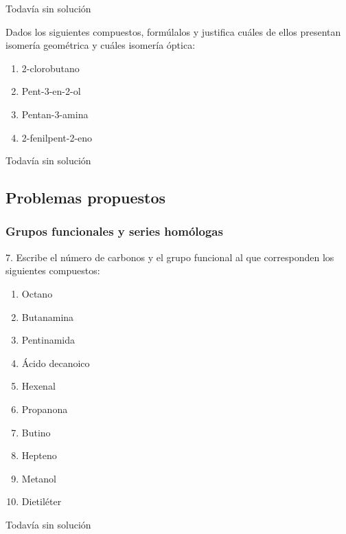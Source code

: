 \documentclass{article}
\begin{document}
\begin{solution}[print=false]
  Todavía sin solución
\end{solution}

\begin{exercise}
  Dados los siguientes compuestos, formúlalos y justifica cuáles
  de ellos presentan isomería geométrica y cuáles isomería
  óptica:
  \begin{enumerate}
    \item 2-clorobutano
    \item Pent-3-en-2-ol
    \item Pentan-3-amina
    \item 2-fenilpent-2-eno
  \end{enumerate}
\end{exercise}

\begin{solution}[print=false]
  Todavía sin solución
\end{solution}

\subsection{Problemas propuestos}

\subsubsection{Grupos funcionales y series homólogas}

\begin{exercise}
  7. Escribe el número de carbonos y el grupo funcional al que
  corresponden los siguientes compuestos:
  \begin{enumerate}
    \item Octano
    \item Butanamina
    \item Pentinamida
    \item Ácido decanoico
    \item Hexenal
    \item Propanona
    \item Butino
    \item Hepteno
    \item Metanol
    \item Dietiléter
  \end{enumerate}
\end{exercise}

\begin{solution}[print=false]
  Todavía sin solución
\end{solution}
\end{document}
